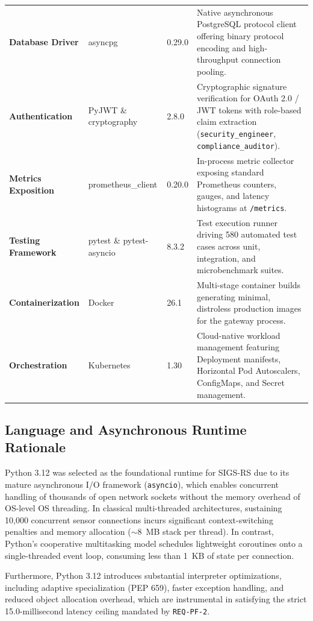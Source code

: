 \begin{table}[H]
\begin{tabularx}{\linewidth}{@{}p{2.8cm} p{2.8cm} p{1.8cm} X@{}}
\textbf{Database Driver} & asyncpg & 0.29.0 & Native asynchronous PostgreSQL protocol client offering binary protocol encoding and high-throughput connection pooling. \\
\textbf{Authentication} & PyJWT \& cryptography & 2.8.0 & Cryptographic signature verification for OAuth 2.0 / JWT tokens with role-based claim extraction (\texttt{security\_engineer}, \texttt{compliance\_auditor}). \\
\textbf{Metrics Exposition} & prometheus\_client & 0.20.0 & In-process metric collector exposing standard Prometheus counters, gauges, and latency histograms at \texttt{/metrics}. \\
\textbf{Testing Framework} & pytest \& pytest-asyncio & 8.3.2 & Test execution runner driving 580 automated test cases across unit, integration, and microbenchmark suites. \\
\textbf{Containerization} & Docker & 26.1 & Multi-stage container builds generating minimal, distroless production images for the gateway process. \\
\textbf{Orchestration} & Kubernetes & 1.30 & Cloud-native workload management featuring Deployment manifests, Horizontal Pod Autoscalers, ConfigMaps, and Secret management. \\
\bottomrule
\end{tabularx}
\end{table}

\subsection{Language and Asynchronous Runtime Rationale}
Python 3.12 was selected as the foundational runtime for SIGS-RS due to its mature asynchronous I/O framework (\texttt{asyncio}), which enables concurrent handling of thousands of open network sockets without the memory overhead of OS-level OS threading. In classical multi-threaded architectures, sustaining 10,000 concurrent sensor connections incurs significant context-switching penalties and memory allocation ($\sim 8$~MB stack per thread). In contrast, Python's cooperative multitasking model schedules lightweight coroutines onto a single-threaded event loop, consuming less than 1~KB of state per connection.

Furthermore, Python 3.12 introduces substantial interpreter optimizations, including adaptive specialization (PEP 659), faster exception handling, and reduced object allocation overhead, which are instrumental in satisfying the strict 15.0-millisecond latency ceiling mandated by \texttt{REQ-PF-2}.

